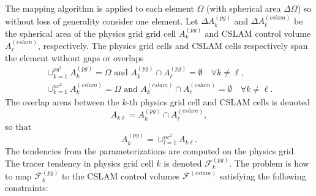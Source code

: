 The mapping algorithm is applied to each element $\Omega$ (with spherical area $\Delta \Omega$) so without loss of generality consider one element. Let $\Delta A^{(pg)}_k$ and $\Delta A^{(cslam)}_\ell$ be the spherical area of the physics grid grid cell $A^{(pg)}_k$ and CSLAM control volume $A^{(cslam)}_\ell$, respectively. The physics grid cells and CSLAM cells respectively span the element without gaps or overlaps
\begin{eqnarray}
\cup_{k=1}^{pg^2}A^{(pg)}_k=\Omega \text{ and } A^{(pg)}_k \cap A^{(pg)}_\ell = \emptyset \quad \forall k\ne \ell,\\
\cup_{k=1}^{nc^2}A^{(cslam)}_k=\Omega \text{ and } A^{(cslam)}_k \cap A^{(cslam)}_\ell = \emptyset \quad \forall k\ne \ell.
\end{eqnarray}
The overlap areas between the $k$-th physics grid cell and CSLAM cells is denoted
\begin{equation}
A_{k\ell}=A^{(pg)}_k \cap A^{(cslam)}_\ell,
\end{equation}
so that
\begin{equation}
A^{(pg)}_k=\cup_{l=1}^{nc^2}A_{k\ell}.
\end{equation}
The tendencies from the parameterizations are computed on the physics grid. The tracer tendency in physics grid cell $k$ is denoted $\mathcal F_k^{(pg)}$. The problem is how to map $\mathcal F_k^{(pg)}$ to the CSLAM control volumes $\mathcal F^{(cslam)}$ satisfying the following constraints:
